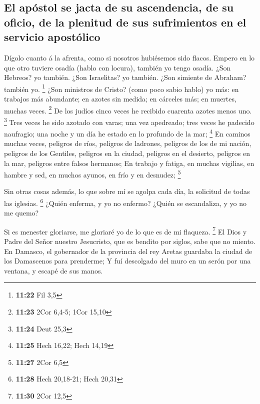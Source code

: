 \hypertarget{el-apuxf3stol-se-jacta-de-su-ascendencia-de-su-oficio-de-la-plenitud-de-sus-sufrimientos-en-el-servicio-apostuxf3lico}{%
\subsection{El apóstol se jacta de su ascendencia, de su oficio, de la
plenitud de sus sufrimientos en el servicio
apostólico}\label{el-apuxf3stol-se-jacta-de-su-ascendencia-de-su-oficio-de-la-plenitud-de-sus-sufrimientos-en-el-servicio-apostuxf3lico}}

 Dígolo cuanto á la afrenta, como si nosotros hubiésemos
sido flacos. Empero en lo que otro tuviere osadía (hablo con locura),
también yo tengo osadía.  ¿Son Hebreos? yo también. ¿Son
Israelitas? yo también. ¿Son simiente de Abraham? también yo.
\footnote{\textbf{11:22} Fil 3,5}  ¿Son ministros de
Cristo? (como poco sabio hablo) yo más: en trabajos más abundante; en
azotes sin medida; en cárceles más; en muertes, muchas veces.
\footnote{\textbf{11:23} 2Cor 6,4-5; 1Cor 15,10}  De los
judíos cinco veces he recibido cuarenta azotes menos uno. \footnote{\textbf{11:24}
  Deut 25,3}  Tres veces he sido azotado con varas; una vez
apedreado; tres veces he padecido naufragio; una noche y un día he
estado en lo profundo de la mar; \footnote{\textbf{11:25} Hech 16,22;
  Hech 14,19}  En caminos muchas veces, peligros de ríos,
peligros de ladrones, peligros de los de mi nación, peligros de los
Gentiles, peligros en la ciudad, peligros en el desierto, peligros en la
mar, peligros entre falsos hermanos;  En trabajo y fatiga,
en muchas vigilias, en hambre y sed, en muchos ayunos, en frío y en
desnudez; \footnote{\textbf{11:27} 2Cor 6,5}

 Sin otras cosas además, lo que sobre mí se agolpa cada
día, la solicitud de todas las iglesias. \footnote{\textbf{11:28} Hech
  20,18-21; Hech 20,31}  ¿Quién enferma, y yo no enfermo?
¿Quién se escandaliza, y yo no me quemo?

 Si es menester gloriarse, me gloriaré yo de lo que es de
mi flaqueza. \footnote{\textbf{11:30} 2Cor 12,5}  El Dios y
Padre del Señor nuestro Jesucristo, que es bendito por siglos, sabe que
no miento.  En Damasco, el gobernador de la provincia del
rey Aretas guardaba la ciudad de los Damascenos para prenderme;
 Y fuí descolgado del muro en un serón por una ventana, y
escapé de sus manos.

